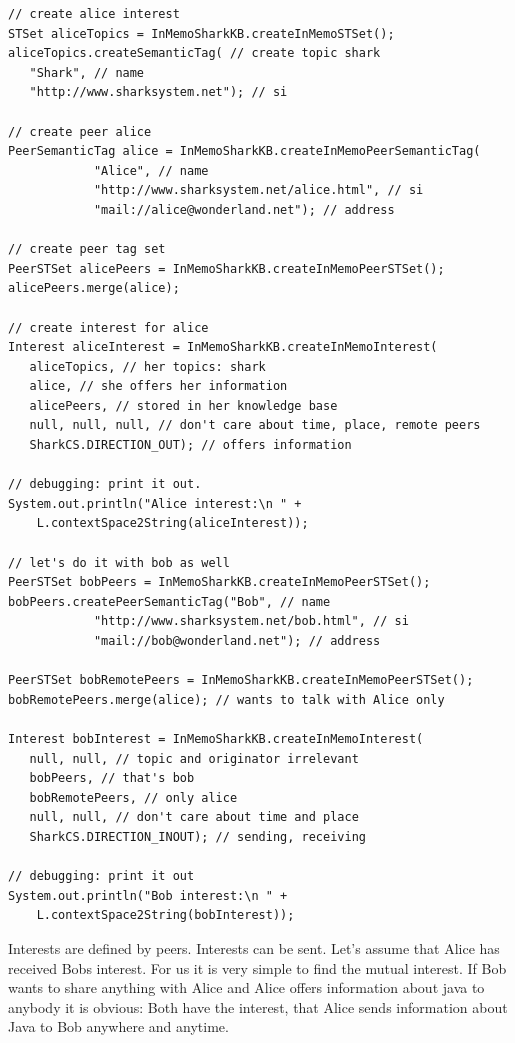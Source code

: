 \begin{verbatim}
// create alice interest
STSet aliceTopics = InMemoSharkKB.createInMemoSTSet();
aliceTopics.createSemanticTag( // create topic shark
   "Shark", // name
   "http://www.sharksystem.net"); // si

// create peer alice
PeerSemanticTag alice = InMemoSharkKB.createInMemoPeerSemanticTag(
            "Alice", // name
            "http://www.sharksystem.net/alice.html", // si
            "mail://alice@wonderland.net"); // address

// create peer tag set
PeerSTSet alicePeers = InMemoSharkKB.createInMemoPeerSTSet();
alicePeers.merge(alice);

// create interest for alice
Interest aliceInterest = InMemoSharkKB.createInMemoInterest(
   aliceTopics, // her topics: shark
   alice, // she offers her information
   alicePeers, // stored in her knowledge base
   null, null, null, // don't care about time, place, remote peers
   SharkCS.DIRECTION_OUT); // offers information

// debugging: print it out.
System.out.println("Alice interest:\n " + 
    L.contextSpace2String(aliceInterest));

// let's do it with bob as well
PeerSTSet bobPeers = InMemoSharkKB.createInMemoPeerSTSet();
bobPeers.createPeerSemanticTag("Bob", // name
            "http://www.sharksystem.net/bob.html", // si
            "mail://bob@wonderland.net"); // address

PeerSTSet bobRemotePeers = InMemoSharkKB.createInMemoPeerSTSet();
bobRemotePeers.merge(alice); // wants to talk with Alice only

Interest bobInterest = InMemoSharkKB.createInMemoInterest(
   null, null, // topic and originator irrelevant
   bobPeers, // that's bob
   bobRemotePeers, // only alice 
   null, null, // don't care about time and place
   SharkCS.DIRECTION_INOUT); // sending, receiving

// debugging: print it out
System.out.println("Bob interest:\n " + 
    L.contextSpace2String(bobInterest));
\end{verbatim}

Interests are defined by peers. Interests can be sent. Let's assume that Alice has received Bobs interest. For us it is very simple to find the mutual interest. If Bob wants to share anything with Alice and Alice offers information about java to anybody it is obvious: Both have the interest, that Alice sends information about Java to Bob anywhere and anytime.

